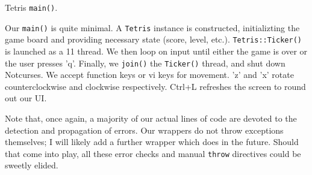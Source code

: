 \begin{listing}[!htb]
\inputminted[]{C}{code-tetris/main.h}
\caption[]{Tetris \texttt{main()}.}
\label{list:tetris-main}
\end{listing}

Our \texttt{main()} is quite minimal. A \texttt{Tetris} instance is
constructed, initializting the game board and providing necessary state (score,
level, etc.). \texttt{Tetris::Ticker()} is launched as a {\CC}11 thread. We
then loop on input until either the game is over or the user presses 'q'.
Finally, we \texttt{join()} the \texttt{Ticker()} thread, and shut down
Notcurses. We accept function keys or vi keys for movement. 'z' and 'x' rotate
counterclockwise and clockwise respectively. Ctrl+L refreshes the screen to
round out our UI.

Note that, once again, a majority of our actual lines of code are devoted to
the detection and propagation of errors. Our \CC wrappers do not throw
exceptions themselves; I will likely add a further \CC wrapper which does in
the future. Should that come into play, all these error checks and manual
\texttt{throw} directives could be sweetly elided.
